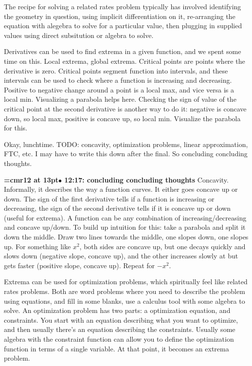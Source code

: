 The recipe for solving a related rates problem typically has involved identifying the geometry in question, using implicit differentiation on it, re-arranging the equation with alegebra to solve for a particular value, then plugging in supplied values using direct subsitution or algebra to solve.
\par

Derivatives can be used to find extrema in a given function, and we spent some time on this. Local extrema, global extrema. Critical points are points where the derivative is zero. Critical points segment function into intervals, and these intervals can be used to check where a function is increasing and decreasing. Positive to negative change around a point is a local max, and vice versa is a local min. Visualizing a parabola helps here. Checking the sign of value of the critical point at the second derivative is another way to do it: negative is concave down, so local max, positive is concave up, so local min. Visualize the parabola for this.
\par

Okay, lunchtime. TODO: concavity, optimization problems, linear approximation, FTC, etc. I may have to write this down after the final. So concluding concluding thoughts.
\par

{\smallskip\noindent\bf\font\titlefont=cmr12 at 13pt\titlefont $\bullet$ 12:17: concluding concluding thoughts}\smallskip
Concavity. Informally, it describes the way a function curves. It either goes concave up or down. The sign of the first derivative tells if a function is increasing or decreasing, the sign of the second derivative tells if it is concave up or down (useful for extrema). A function can be any combination of increasing/decreasing and concave up/down. To build up intuition for this: take a parabola and split it down the middle. Draw two lines towards the middle, one slopes down, one slopes up. For something like $x^2$, both sides are concave up, but one decays quickly and slows down (negative slope, concave up), and the other increases slowly at but gets faster (positive slope, concave up). Repeat for $-x^2$.
\par

Extrema can be used for optimization problems, which spiritually feel like related rates problems. Both are word problems where you need to describe the problem using equations, and fill in some blanks, use a calculus tool with some algebra to solve. An optimization problem has two parts: a optimization equation, and constraints. You start with an equation describing what you want to optimize, and then usually there's an equation describing the constraints. Usually some algebra with the constraint function can allow you to define the optimization function in terms of a single variable. At that point, it becomes an extrema problem.
\par

